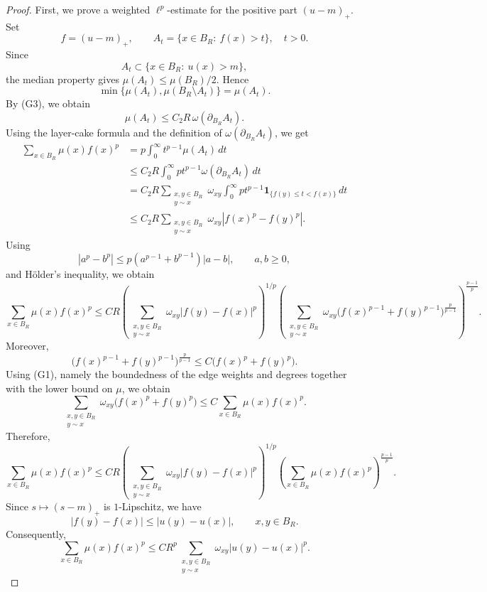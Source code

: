 \documentclass[10pt,a4paper]{amsart}
\begin{document}
\begin{proof}
First, we  prove a weighted \(\ell^p\)-estimate for the positive part \((u-m)_+\). Set
\[
f=(u-m)_+,
\qquad
A_t=\{x\in B_R:\ f(x)>t\},\quad t>0.
\]
Since
\[
A_t\subset \{x\in B_R:\ u(x)>m\},
\]
the median property gives \(\mu(A_t)\le \mu(B_R)/2\). Hence
\[
\min\{\mu(A_t),\mu(B_R\setminus A_t)\}=\mu(A_t).
\]
By {\rm(G3)}, we obtain
\[
\mu(A_t)\le C_2R\,\omega(\partial_{B_R}A_t).
\]
Using the layer-cake formula and the definition of
\(\omega(\partial_{B_R}A_t)\), we get
\[
\begin{aligned}
\sum_{x\in B_R}\mu(x)f(x)^p
&=
p\int_0^\infty t^{p-1}\mu(A_t)\,dt \\
&\le
C_2R
\int_0^\infty p t^{p-1}\omega(\partial_{B_R}A_t)\,dt  \\
&=
C_2R
\sum_{\substack{x,y\in B_R\\ y\sim x}}
\omega_{xy}
\int_0^\infty p t^{p-1}
\mathbf 1_{\{f(y)\le t<f(x)\}}\,dt \\
&\le
C_2R
\sum_{\substack{x,y\in B_R\\ y\sim x}}
\omega_{xy}|f(x)^p-f(y)^p|.
\end{aligned}
\]
Using
\[
|a^p-b^p|
\le
p(a^{p-1}+b^{p-1})|a-b|,
\qquad a,b\ge0,
\]
and H\"older's inequality, we obtain
\[
\sum_{x\in B_R}\mu(x)f(x)^p
\le
C R
\left(
\sum_{\substack{x,y\in B_R\\ y\sim x}}
\omega_{xy}|f(y)-f(x)|^p
\right)^{1/p} 
\left(
\sum_{\substack{x,y\in B_R\\ y\sim x}}
\omega_{xy}
\bigl(f(x)^{p-1}+f(y)^{p-1}\bigr)^{\frac{p}{p-1}}
\right)^{\frac{p-1}{p}}.
\]
Moreover,
\[
\bigl(f(x)^{p-1}+f(y)^{p-1}\bigr)^{\frac{p}{p-1}}
\le
C\bigl(f(x)^p+f(y)^p\bigr).
\]
Using {\rm(G1)}, namely the boundedness of the edge weights and degrees
together with the lower bound on \(\mu\), we obtain
\[
\sum_{\substack{x,y\in B_R\\ y\sim x}}
\omega_{xy}\bigl(f(x)^p+f(y)^p\bigr)
\le
C
\sum_{x\in B_R}\mu(x)f(x)^p.
\]
Therefore,
\[
\sum_{x\in B_R}\mu(x)f(x)^p
\le
C R
\left(
\sum_{\substack{x,y\in B_R\\ y\sim x}}
\omega_{xy}|f(y)-f(x)|^p
\right)^{1/p}
\left(
\sum_{x\in B_R}\mu(x)f(x)^p
\right)^{\frac{p-1}{p}}.
\]
Since \(s\mapsto (s-m)_+\) is \(1\)-Lipschitz, we have
\[
|f(y)-f(x)|\le |u(y)-u(x)|,
\qquad x,y\in B_R.
\]
Consequently,
\begin{equation}\label{chang1}
\sum_{x\in B_R}\mu(x)f(x)^p
\le
C R^p
\sum_{\substack{x,y\in B_R\\ y\sim x}}
\omega_{xy}|u(y)-u(x)|^p.
\end{equation}


\end{proof}
\end{document}
